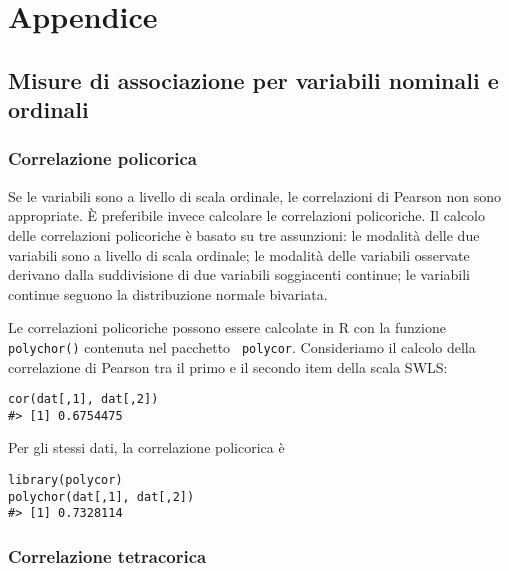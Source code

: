 \chapter{Appendice}
\label{chapter:appendix2} %

\section{Misure di associazione per variabili nominali e ordinali}


\subsection{Correlazione policorica}

Se le variabili sono a livello di scala ordinale, le correlazioni di Pearson non sono appropriate. 
È  preferibile invece calcolare  le correlazioni policoriche. Il calcolo delle correlazioni policoriche è basato su tre assunzioni:
 le modalità delle due variabili sono a livello di scala ordinale;
 le modalità delle variabili osservate derivano dalla
  suddivisione di due variabili soggiacenti continue; 
 le variabili continue seguono la distribuzione normale bivariata. 

\begin{exmp}
Le correlazioni policoriche possono essere calcolate in R con
    la funzione {\tt polychor()} contenuta nel pacchetto {\tt
      polycor}.  
   Consideriamo il calcolo della correlazione di Pearson tra 
  il primo e il secondo item della scala SWLS:
\begin{lstlisting}
cor(dat[,1], dat[,2])
#> [1] 0.6754475
\end{lstlisting}
Per gli stessi dati, la correlazione policorica è
\begin{lstlisting}
library(polycor)
polychor(dat[,1], dat[,2])
#> [1] 0.7328114
\end{lstlisting} 
\end{exmp}


\subsection{Correlazione tetracorica}

